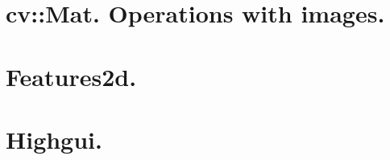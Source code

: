 
\chapter{cv::Mat. Operations with images.}
\renewcommand{\curModule}{cv::Mat. Operations with images.}


\chapter{Features2d.}
\renewcommand{\curModule}{Features2d}


\chapter{Highgui.}
\renewcommand{\curModule}{Highgui.}

